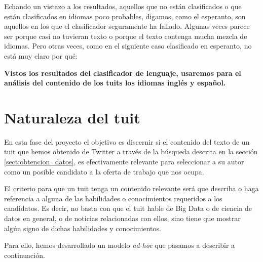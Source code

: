 
Echando un vistazo a los resultados, aquellos que no están clasificados o que están
clasificados en idiomas poco probables, digamos, como el esperanto, son aquellos en los
que el clasificador seguramente ha fallado. Algunas veces parece ser porque casi no 
tuvieran texto o porque el texto contenga mucha mezcla de idiomas. Pero otras veces, 
como en el siguiente caso clasificado en esperanto, no está muy claro por qué:



{\bf Vistos los resultados del clasificador de lenguaje, usaremos para el análisis del 
contenido de los tuits los idiomas inglés y español.}

\section{Naturaleza del tuit}
\label{sect:tuits_relevantes}

En esta fase del proyecto el objetivo es discernir si el contenido del texto de un tuit que hemos
obtenido de Twitter a través de la búsqueda descrita en la sección \ref{sect:obtencion_datos},
es efectivamente relevante para seleccionar a su autor como un posible candidato
a la oferta de trabajo que nos ocupa.

El criterio para que un tuit tenga un contenido relevante será que describa o haga referencia
a alguna de las habilidades o conocimientos requeridos a los candidatos. Es decir, no 
basta con que el tuit hable de Big Data o de ciencia de datos en general, o de noticias 
relacionadas con ellos, sino tiene que mostrar algún signo de dichas habilidades y conocimientos.

Para ello, hemos desarrollado un modelo {\em ad-hoc} que pasamos a describir a continuación.

